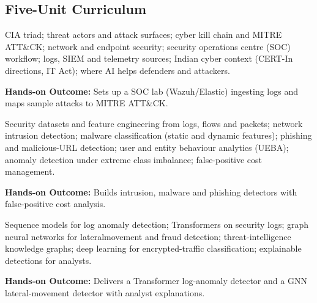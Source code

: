 \documentclass[10pt,a4paper]{article}
\begin{document}
\subsection*{Five-Unit Curriculum}
\begin{tcolorbox}[unitbox,title={{\color{gold}UNIT I}\quad Cybersecurity Foundations for AI Engineers\hfill{\color{gold}9 Hours}}]\small CIA triad; threat actors and attack surfaces; cyber kill chain and MITRE ATT\&CK; network and endpoint security; security operations centre (SOC) workflow; logs, SIEM and telemetry sources; Indian cyber context (CERT-In directions, IT Act); where AI helps defenders and attackers.\par\vspace{2pt}\par\textbf{Hands-on Outcome:} Sets up a SOC lab (Wazuh/Elastic) ingesting logs and maps sample attacks to MITRE ATT\&CK.\end{tcolorbox}
\begin{tcolorbox}[unitbox,title={{\color{gold}UNIT II}\quad ML for Threat Detection\hfill{\color{gold}9 Hours}}]\small Security datasets and feature engineering from logs, flows and packets; network intrusion detection; malware classification (static and dynamic features); phishing and malicious-URL detection; user and entity behaviour analytics (UEBA); anomaly detection under extreme class imbalance; false-positive cost management.\par\vspace{2pt}\par\textbf{Hands-on Outcome:} Builds intrusion, malware and phishing detectors with false-positive cost analysis.\end{tcolorbox}
\begin{tcolorbox}[unitbox,title={{\color{gold}UNIT III}\quad Deep Learning and Graph Methods for Security\hfill{\color{gold}9 Hours}}]\small Sequence models for log anomaly detection; Transformers on security logs; graph neural networks for lateralmovement and fraud detection; threat-intelligence knowledge graphs; deep learning for encrypted-traﬀic classification; explainable detections for analysts.\par\vspace{2pt}\par\textbf{Hands-on Outcome:} Delivers a Transformer log-anomaly detector and a GNN lateral-movement detector with analyst explanations.\end{tcolorbox}
\end{document}
